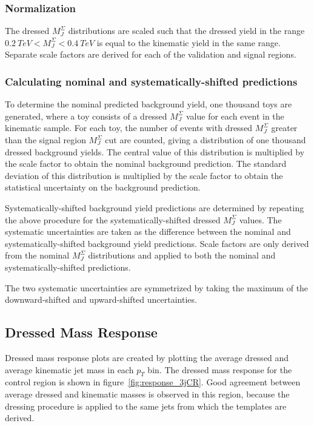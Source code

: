 \subsubsection{Normalization}
The dressed $M_{J}^{\Sigma}$ distributions are scaled such that the dressed yield in the range  $0.2~TeV < M_{J}^{\Sigma} < 0.4~TeV$ is equal to the kinematic yield in the same range.
Separate scale factors are derived for each of the validation and signal regions.

\subsubsection{Calculating nominal and systematically-shifted predictions}
To determine the nominal predicted background yield, one thousand toys are generated,
where a toy consists of a dressed $M_{J}^{\Sigma}$ value for each event in the kinematic sample.
For each toy, the number of events with dressed $M_{J}^{\Sigma}$ greater than the signal region $M_{J}^{\Sigma}$ cut are counted,
giving a distribution of one thousand dressed background yields.
The central value of this distribution is multiplied by the scale factor to obtain the nominal background prediction.
The standard deviation of this distribution is multiplied by the scale factor to obtain the statistical uncertainty on the background prediction.

Systematically-shifted background yield predictions are determined by repeating the above procedure for the systematically-shifted dressed $M_{J}^{\Sigma}$ values.
The systematic uncertainties are taken as the difference between the nominal and systematically-shifted background yield predictions.
Scale factors are only derived from the nominal $M_{J}^{\Sigma}$ distributions and applied to both the nominal and systematically-shifted predictions.

The two systematic uncertainties are symmetrized by taking the maximum of the downward-shifted and upward-shifted uncertainties.

\subsection{Dressed Mass Response} \label{subsec:response}
Dressed mass response plots are created by plotting the average dressed and average kinematic jet mass in each $p_T$ bin.
The dressed mass response for the control region is shown in figure~\ref{fig:response_3jCR}.
Good agreement between average dressed and kinematic masses is observed in this region,
because the dressing procedure is applied to the same jets from which the templates are derived.

